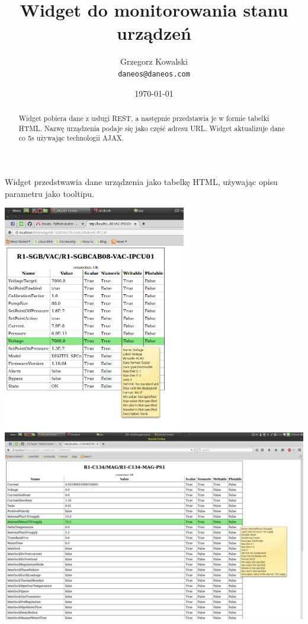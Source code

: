 \documentclass[12pt,a4paper]{article}
\title{Widget do monitorowania stanu urządzeń}
\author{Grzegorz Kowalski\\\texttt{daneos@daneos.com}}
\date{\today}
\begin{document}
\maketitle

\begin{abstract}
Widget pobiera dane z usługi REST, a następnie przedstawia je w formie tabelki HTML. Nazwę urządzenia podaje się jako część adresu URL. Widget aktualizuje dane co 5s używając technologii AJAX.
\end{abstract}

Widget przedstwawia dane urządzenia jako tabelkę HTML, używając opisu parametru jako tooltipu.\\
\begin{center}
\includegraphics[width=0.6\textwidth]{./widget1.png}
\includegraphics[width=\textwidth]{./widget2.png}
\end{center}
\end{document}
